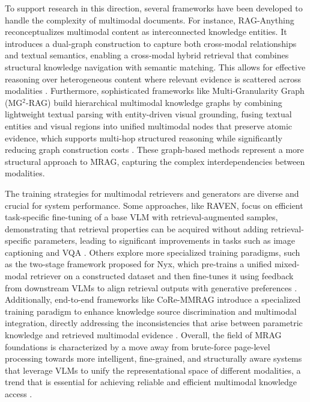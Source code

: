 \documentclass[11pt]{article}
\begin{document}
To support research in this direction, several frameworks have been developed to handle the complexity of multimodal documents. For instance, RAG-Anything reconceptualizes multimodal content as interconnected knowledge entities. It introduces a dual-graph construction to capture both cross-modal relationships and textual semantics, enabling a cross-modal hybrid retrieval that combines structural knowledge navigation with semantic matching. This allows for effective reasoning over heterogeneous content where relevant evidence is scattered across modalities \cite{ref44}. Furthermore, sophisticated frameworks like Multi-Granularity Graph (MG\(^2\)-RAG) build hierarchical multimodal knowledge graphs by combining lightweight textual parsing with entity-driven visual grounding, fusing textual entities and visual regions into unified multimodal nodes that preserve atomic evidence, which supports multi-hop structured reasoning while significantly reducing graph construction costs \cite{ref46}. These graph-based methods represent a more structural approach to MRAG, capturing the complex interdependencies between modalities.

The training strategies for multimodal retrievers and generators are diverse and crucial for system performance. Some approaches, like RAVEN, focus on efficient task-specific fine-tuning of a base VLM with retrieval-augmented samples, demonstrating that retrieval properties can be acquired without adding retrieval-specific parameters, leading to significant improvements in tasks such as image captioning and VQA \cite{ref352}. Others explore more specialized training paradigms, such as the two-stage framework proposed for Nyx, which pre-trains a unified mixed-modal retriever on a constructed dataset and then fine-tunes it using feedback from downstream VLMs to align retrieval outputs with generative preferences \cite{ref353}. Additionally, end-to-end frameworks like CoRe-MMRAG introduce a specialized training paradigm to enhance knowledge source discrimination and multimodal integration, directly addressing the inconsistencies that arise between parametric knowledge and retrieved multimodal evidence \cite{ref354}. Overall, the field of MRAG foundations is characterized by a move away from brute-force page-level processing towards more intelligent, fine-grained, and structurally aware systems that leverage VLMs to unify the representational space of different modalities, a trend that is essential for achieving reliable and efficient multimodal knowledge access \cite{ref355}.
\end{document}
